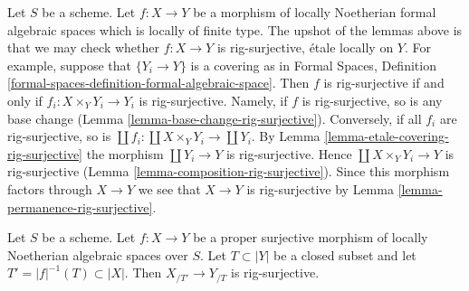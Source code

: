 \begin{remark}
\label{remark-upshot}
Let $S$ be a scheme. Let $f : X \to Y$ be a morphism of
locally Noetherian formal algebraic spaces which is locally of finite type.
The upshot of the lemmas above is that we may check whether
$f : X \to Y$ is rig-surjective, \'etale locally on $Y$. For example,
suppose that $\{Y_i \to Y\}$ is a covering as in
Formal Spaces, Definition \ref{formal-spaces-definition-formal-algebraic-space}.
Then $f$ is rig-surjective if and only if $f_i : X \times_Y Y_i \to Y_i$ is
rig-surjective. Namely, if $f$ is rig-surjective, so is any base change
(Lemma \ref{lemma-base-change-rig-surjective}).
Conversely, if all $f_i$ are rig-surjective, so is
$\coprod f_i : \coprod X \times_Y Y_i \to \coprod Y_i$.
By Lemma \ref{lemma-etale-covering-rig-surjective}
the morphism $\coprod Y_i \to Y$ is rig-surjective.
Hence $\coprod X \times_Y Y_i \to Y$ is rig-surjective
(Lemma \ref{lemma-composition-rig-surjective}).
Since this morphism factors through $X \to Y$ we see that $X \to Y$
is rig-surjective by Lemma \ref{lemma-permanence-rig-surjective}.
\end{remark}

\begin{lemma}
\label{lemma-completion-proper-surjective-rig-surjective}
Let $S$ be a scheme. Let $f : X \to Y$ be a proper surjective morphism
of locally Noetherian algebraic spaces over $S$. Let $T \subset |Y|$
be a closed subset and let $T' = |f|^{-1}(T) \subset |X|$.
Then $X_{/T'} \to Y_{/T}$ is rig-surjective.
\end{lemma}

